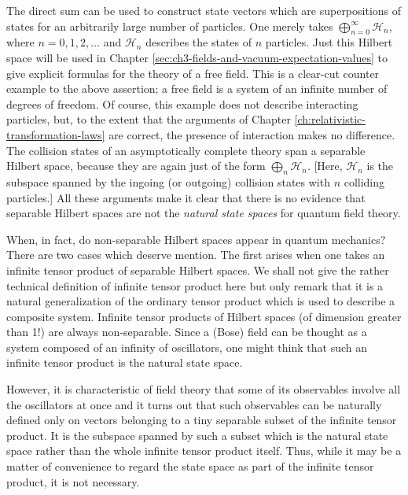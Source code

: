 The direct sum can be used to construct state vectors which are
superpositions of states for an arbitrarily large number of particles.  One
merely takes $\bigoplus_{n=0}^{\infty}\mathcal{H}_n$, where $n=0,1,2,\ldots$ and
$\mathcal{H}_n$ describes the states of $n$ particles.  Just this Hilbert
space will be used in Chapter \ref{sec:ch3-fields-and-vacuum-expectation-values} to give explicit formulas for the theory of a
free field.  This is a clear-cut counter example to the above assertion; a
free field is a system of an infinite number of degrees of freedom.  Of
course, this example does not describe interacting particles, but, to the
extent that the arguments of Chapter \ref{ch:relativistic-transformation-laws} are correct, the presence of
interaction makes no difference.  The collision states of an asymptotically
complete theory span a separable Hilbert space, because they are again just of
the form $\bigoplus_n\mathcal{H}_n$.  [Here, $\mathcal{H}_n$ is the subspace
spanned by the ingoing (or outgoing) collision states with $n$ colliding
particles.]  All these arguments make it clear that there is no evidence
that separable Hilbert spaces are not the \emph{natural state spaces} for
quantum field theory.

When, in fact, do non-separable Hilbert spaces appear in quantum mechanics?
There are two cases which deserve mention.  The first arises when one takes
an infinite tensor product of separable Hilbert spaces.  We shall not give the
rather technical definition of infinite tensor product here but only remark
that it is a natural generalization of the ordinary tensor product which is
used to describe a composite system.  Infinite tensor products of Hilbert
spaces (of dimension greater than 1!) are always non-separable.  Since a
(Bose) field can be thought as a system composed of an infinity of
oscillators, one might think that such an infinite tensor product is the
natural state space.

However, it is characteristic of field theory that some of its observables
involve all the oscillators at once and it turns out that such observables can
be naturally defined only on vectors belonging to a tiny separable subset of
the infinite tensor product.  It is the subspace spanned by such a subset
which is the natural state space rather than the whole infinite tensor
product itself.  Thus, while it may be a matter of convenience to regard the
state space as part of the infinite tensor product, it is not necessary.

